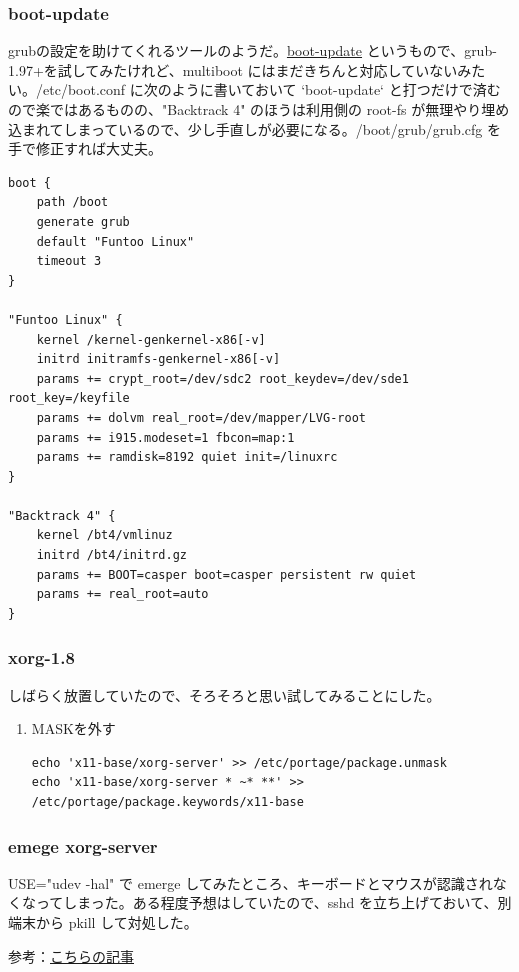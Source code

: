 \documentclass[11pt]{article}
\begin{document}
\subsubsection{boot-update}
\label{sec:org97d8672}
grubの設定を助けてくれるツールのようだ。\href{http://www.funtoo.org/en/funtoo/core/boot/}{boot-update} というもので、grub-1.97+を試してみたけれど、multiboot にはまだきちんと対応していないみたい。/etc/boot.conf に次のように書いておいて `boot-update` と打つだけで済むので楽ではあるものの、"Backtrack 4" のほうは利用側の root-fs が無理やり埋め込まれてしまっているので、少し手直しが必要になる。/boot/grub/grub.cfg を手で修正すれば大丈夫。

\begin{verbatim}
boot {
    path /boot
    generate grub
    default "Funtoo Linux"
    timeout 3
}

"Funtoo Linux" {
    kernel /kernel-genkernel-x86[-v]
    initrd initramfs-genkernel-x86[-v]
    params += crypt_root=/dev/sdc2 root_keydev=/dev/sde1 root_key=/keyfile
    params += dolvm real_root=/dev/mapper/LVG-root
    params += i915.modeset=1 fbcon=map:1
    params += ramdisk=8192 quiet init=/linuxrc
}

"Backtrack 4" {
    kernel /bt4/vmlinuz
    initrd /bt4/initrd.gz
    params += BOOT=casper boot=casper persistent rw quiet
    params += real_root=auto
}
\end{verbatim}
\subsubsection{xorg-1.8}
\label{sec:org14014b7}
しばらく放置していたので、そろそろと思い試してみることにした。
\begin{enumerate}
\item MASKを外す
\label{sec:orgd1b496a}
\begin{verbatim}
echo 'x11-base/xorg-server' >> /etc/portage/package.unmask
echo 'x11-base/xorg-server * ~* **' >> /etc/portage/package.keywords/x11-base
\end{verbatim}
\end{enumerate}
\subsubsection{emege xorg-server}
\label{sec:org7c40121}
USE="udev -hal" で emerge してみたところ、キーボードとマウスが認識されなくなってしまった。ある程度予想はしていたので、sshd を立ち上げておいて、別端末から pkill して対処した。

参考：\href{http://body0r.wordpress.com/2010/04/16/xorg-udev-toggle/}{こちらの記事}
\end{document}
